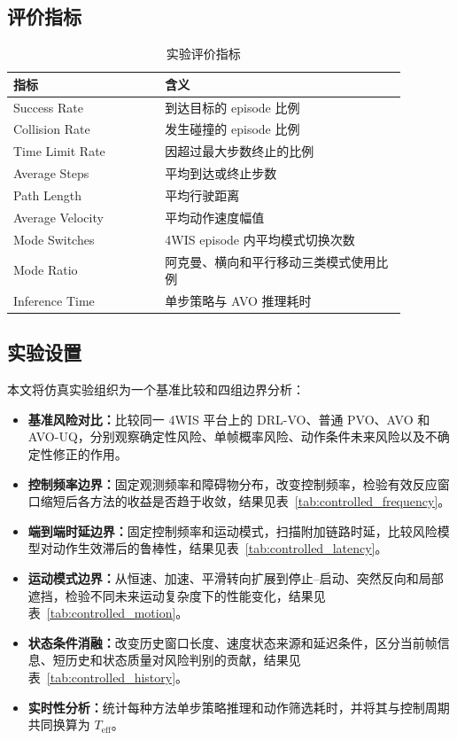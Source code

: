 \documentclass[UTF8,10pt,a4paper,twocolumn]{ctexart}
\begin{document}
\subsection{评价指标}

\begin{table}[H]
    \centering

    \caption{实验评价指标}
    \label{tab:metrics}
    \small
    \begin{tabular}
{p{0.34\linewidth}p{0.54\linewidth}}
        \toprule

        指标 & 含义 \\
        \midrule

        Success Rate & 到达目标的 episode 比例 \\
        Collision Rate & 发生碰撞的 episode 比例 \\
        Time Limit Rate & 因超过最大步数终止的比例 \\
        Average Steps & 平均到达或终止步数 \\
        Path Length & 平均行驶距离 \\
        Average Velocity & 平均动作速度幅值 \\
        Mode Switches & 4WIS episode 内平均模式切换次数 \\
        Mode Ratio & 阿克曼、横向和平行移动三类模式使用比例 \\
        Inference Time & 单步策略与 AVO 推理耗时 \\
        \bottomrule

    
\end{tabular}
\end{table}

\subsection{实验设置}

本文将仿真实验组织为一个基准比较和四组边界分析：
\begin{itemize}
    \item \textbf{基准风险对比：}比较同一 4WIS 平台上的 DRL-VO、普通 PVO、AVO 和 AVO-UQ，分别观察确定性风险、单帧概率风险、动作条件未来风险以及不确定性修正的作用。
    \item \textbf{控制频率边界：}固定观测频率和障碍物分布，改变控制频率，检验有效反应窗口缩短后各方法的收益是否趋于收敛，结果见表~\ref{tab:controlled_frequency}。
    \item \textbf{端到端时延边界：}固定控制频率和运动模式，扫描附加链路时延，比较风险模型对动作生效滞后的鲁棒性，结果见表~\ref{tab:controlled_latency}。
    \item \textbf{运动模式边界：}从恒速、加速、平滑转向扩展到停止--启动、突然反向和局部遮挡，检验不同未来运动复杂度下的性能变化，结果见表~\ref{tab:controlled_motion}。
    \item \textbf{状态条件消融：}改变历史窗口长度、速度状态来源和延迟条件，区分当前帧信息、短历史和状态质量对风险判别的贡献，结果见表~\ref{tab:controlled_history}。
    \item \textbf{实时性分析：}统计每种方法单步策略推理和动作筛选耗时，并将其与控制周期共同换算为 $T_{\mathrm{eff}}$。
\end{itemize}
\end{document}
